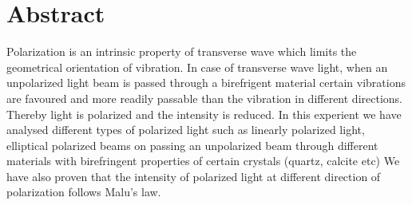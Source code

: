 \section{Abstract} 
Polarization is an intrinsic property of transverse wave which limits the geometrical orientation of vibration. In case of transverse wave light, when an unpolarized light beam is passed through a birefrigent material certain vibrations are favoured and more readily passable than the vibration in different directions. Thereby light is polarized and the intensity is reduced. In this experient we have analysed different types of polarized light such as linearly polarized light, elliptical polarized beams on passing an unpolarized beam through different materials with birefringent properties of certain crystals (quartz, calcite etc) We have also proven that the intensity of polarized light at different direction of polarization follows Malu's law.
